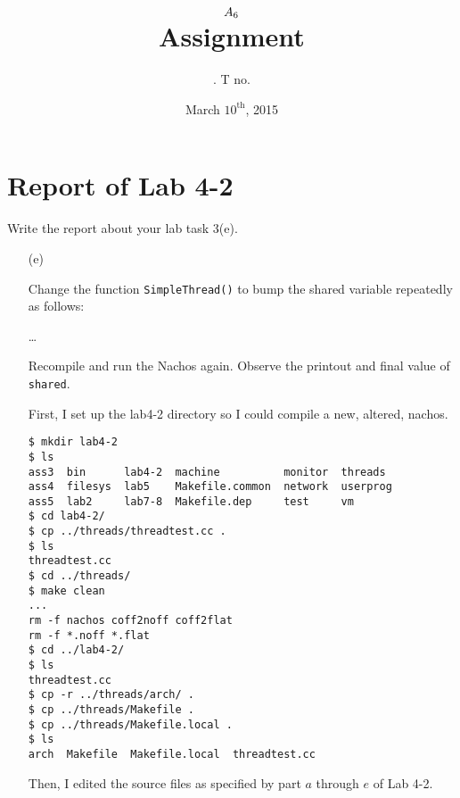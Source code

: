 \documentclass[11pt]{article}
\title{
    $A_{6}$ \\
    {\large Assignment \rom{\hw}}
}
\author{
    \name. T no. \tno
}
\date{March $10^{\text{th}}$, 2015}
\begin{document}
\maketitle

\setcounter{section}{1}
\section{Report of Lab 4-2}

    \begin{question}
        Write the report about your lab task 3(e).
        \begin{itemize}
        \item[(e)]{Change the function {\tt SimpleThread()} to bump the shared variable repeatedly as follows:

        \ldots

        Recompile and run the Nachos again. Observe the printout and final value of {\tt shared}.

        First, I set up the lab4-2 directory so I could compile a new, altered, nachos.

        \begin{verbatim}
$ mkdir lab4-2
$ ls
ass3  bin      lab4-2  machine          monitor  threads
ass4  filesys  lab5    Makefile.common  network  userprog
ass5  lab2     lab7-8  Makefile.dep     test     vm
$ cd lab4-2/
$ cp ../threads/threadtest.cc .
$ ls
threadtest.cc
$ cd ../threads/
$ make clean
...
rm -f nachos coff2noff coff2flat
rm -f *.noff *.flat
$ cd ../lab4-2/
$ ls
threadtest.cc
$ cp -r ../threads/arch/ .
$ cp ../threads/Makefile .
$ cp ../threads/Makefile.local .
$ ls
arch  Makefile  Makefile.local  threadtest.cc
        \end{verbatim}

        Then, I edited the source files as specified by part $a$ through $e$ of Lab 4-2.

}
\end{itemize}
\end{question}
\end{document}
